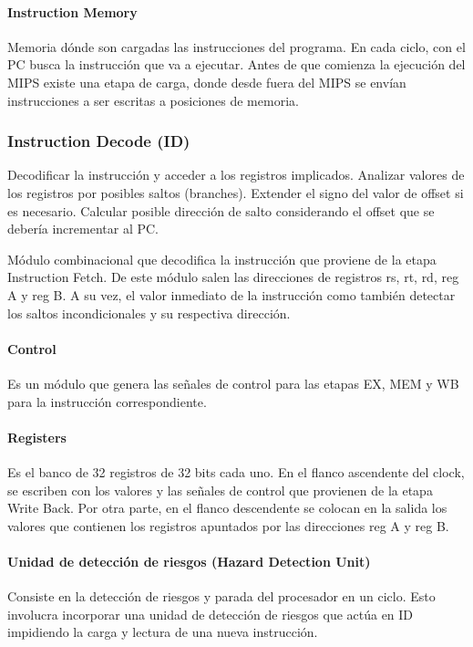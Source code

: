 \documentclass[12pt,A4paper,titlepage]{article}
\begin{document}
\newpage
\paragraph{Instruction Memory} 
\hfill \par
Memoria dónde son cargadas las instrucciones del programa.  En cada ciclo, con el PC busca la instrucción que va a ejecutar. Antes de que comienza la ejecución del MIPS existe una etapa de carga, donde desde fuera del MIPS se envían instrucciones a ser escritas a posiciones de memoria.


\subsubsection{Instruction Decode (ID)}
Decodificar la instrucción y acceder a los registros implicados. Analizar valores de los registros por posibles saltos (branches). Extender el signo del valor de offset si es necesario. Calcular posible dirección de salto considerando el offset que se debería incrementar al PC.

Módulo combinacional que decodifica la instrucción que proviene de la etapa Instruction Fetch. De este módulo salen las direcciones de registros rs, rt, rd, reg A y reg B. A su vez, el valor inmediato de la instrucción como también detectar los saltos incondicionales y su respectiva dirección.

\paragraph{Control}
\hfill \par
Es un módulo que genera las señales de control para las etapas EX, MEM y WB para la instrucción correspondiente.

\paragraph{Registers}
\hfill \par
Es el banco de 32 registros de 32 bits cada uno. En el flanco ascendente del clock, se escriben con los valores y las señales de control que provienen de la etapa Write Back. Por otra parte, en el flanco descendente se colocan en la salida los valores que contienen los registros apuntados por las direcciones reg A y reg B.

\newpage
\paragraph{Unidad de detección de riesgos (Hazard Detection Unit)}
\hfill \par
Consiste en la detección de riesgos y parada del procesador en un ciclo. Esto involucra incorporar una unidad de detección de riesgos que actúa en ID impidiendo la carga y lectura de una nueva instrucción.
\end{document}
